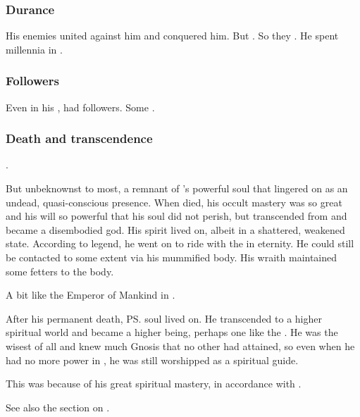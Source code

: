 \subsubsection{Durance}
His enemies united against him and conquered him. 
But . 
So they . 
He spent millennia in . 





\subsubsection{Followers}
Even in his , \Sethicus had followers.
Some \ophidians {}. 





\subsubsection{Death and transcendence}
\Sethicus {}. 

But unbeknownst to most, a remnant of \Sethicus's powerful soul that lingered on as an undead, quasi-conscious presence.
When \Sethicus died, his occult mastery was so great and his will so powerful that his soul did not perish, but transcended from \Miith and became a disembodied god.
His spirit lived on, albeit in a shattered, weakened state.
According to legend, he went on to ride with the \xss in eternity.
He could still be contacted to some extent via his mummified body.
His wraith maintained some fetters to the body.

A bit like the Emperor of Mankind in \cite{RPG:Warhammer40000}.

After his permanent death, \ps{\Sethicus} soul lived on. 
He transcended to a higher spiritual world and became a higher being, perhaps one like the \xss. 
He was the wisest of all \dragons and knew much Gnosis that no other \dragon had attained, so even when he had no more power in \Miith, he was still worshipped as a spiritual guide. 

This was because of his great spiritual mastery, in accordance with . 

See also the section on . 

